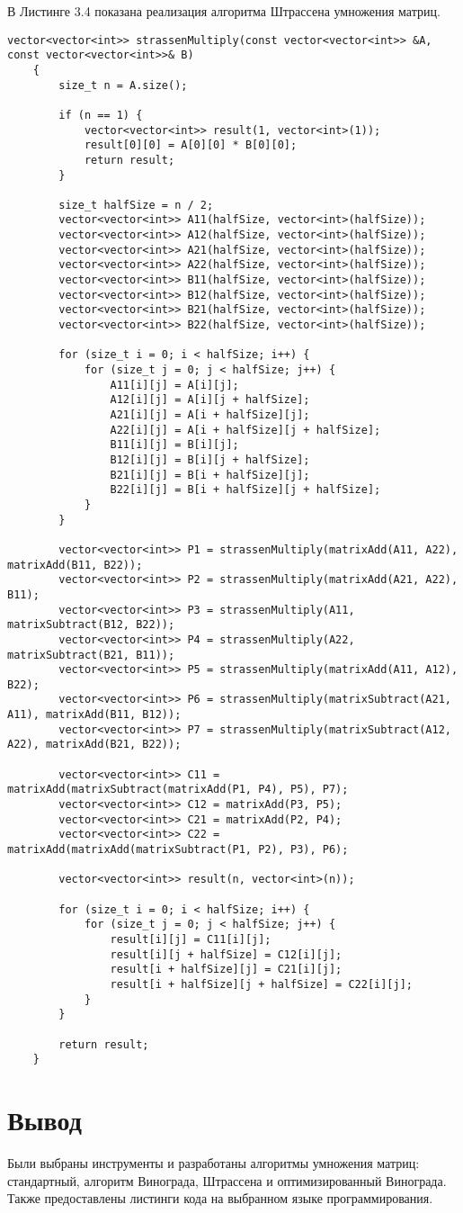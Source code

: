 В Листинге 3.4 показана реализация алгоритма Штрассена умножения матриц.
\begin{lstlisting}[caption=Алгоритм Штрассена умножения матриц]
	vector<vector<int>> strassenMultiply(const vector<vector<int>> &A, const vector<vector<int>>& B) 
	{
		size_t n = A.size();
		
		if (n == 1) {
			vector<vector<int>> result(1, vector<int>(1));
			result[0][0] = A[0][0] * B[0][0];
			return result;
		}
		
		size_t halfSize = n / 2;
		vector<vector<int>> A11(halfSize, vector<int>(halfSize));
		vector<vector<int>> A12(halfSize, vector<int>(halfSize));
		vector<vector<int>> A21(halfSize, vector<int>(halfSize));
		vector<vector<int>> A22(halfSize, vector<int>(halfSize));
		vector<vector<int>> B11(halfSize, vector<int>(halfSize));
		vector<vector<int>> B12(halfSize, vector<int>(halfSize));
		vector<vector<int>> B21(halfSize, vector<int>(halfSize));
		vector<vector<int>> B22(halfSize, vector<int>(halfSize));
		
		for (size_t i = 0; i < halfSize; i++) {
			for (size_t j = 0; j < halfSize; j++) {
				A11[i][j] = A[i][j];
				A12[i][j] = A[i][j + halfSize];
				A21[i][j] = A[i + halfSize][j];
				A22[i][j] = A[i + halfSize][j + halfSize];
				B11[i][j] = B[i][j];
				B12[i][j] = B[i][j + halfSize];
				B21[i][j] = B[i + halfSize][j];
				B22[i][j] = B[i + halfSize][j + halfSize];
			}
		}
		
		vector<vector<int>> P1 = strassenMultiply(matrixAdd(A11, A22), matrixAdd(B11, B22));
		vector<vector<int>> P2 = strassenMultiply(matrixAdd(A21, A22), B11);
		vector<vector<int>> P3 = strassenMultiply(A11, matrixSubtract(B12, B22));
		vector<vector<int>> P4 = strassenMultiply(A22, matrixSubtract(B21, B11));
		vector<vector<int>> P5 = strassenMultiply(matrixAdd(A11, A12), B22);
		vector<vector<int>> P6 = strassenMultiply(matrixSubtract(A21, A11), matrixAdd(B11, B12));
		vector<vector<int>> P7 = strassenMultiply(matrixSubtract(A12, A22), matrixAdd(B21, B22));
		
		vector<vector<int>> C11 = matrixAdd(matrixSubtract(matrixAdd(P1, P4), P5), P7);
		vector<vector<int>> C12 = matrixAdd(P3, P5);
		vector<vector<int>> C21 = matrixAdd(P2, P4);
		vector<vector<int>> C22 = matrixAdd(matrixAdd(matrixSubtract(P1, P2), P3), P6);
		
		vector<vector<int>> result(n, vector<int>(n));
		
		for (size_t i = 0; i < halfSize; i++) {
			for (size_t j = 0; j < halfSize; j++) {
				result[i][j] = C11[i][j];
				result[i][j + halfSize] = C12[i][j];
				result[i + halfSize][j] = C21[i][j];
				result[i + halfSize][j + halfSize] = C22[i][j];
			}
		}
		
		return result;
	}
\end{lstlisting}

\section*{Вывод}

Были выбраны инструменты и разработаны алгоритмы умножения матриц: стандартный, алгоритм Винограда, Штрассена и оптимизированный Винограда. 
Также предоставлены листинги кода на выбранном языке программирования.